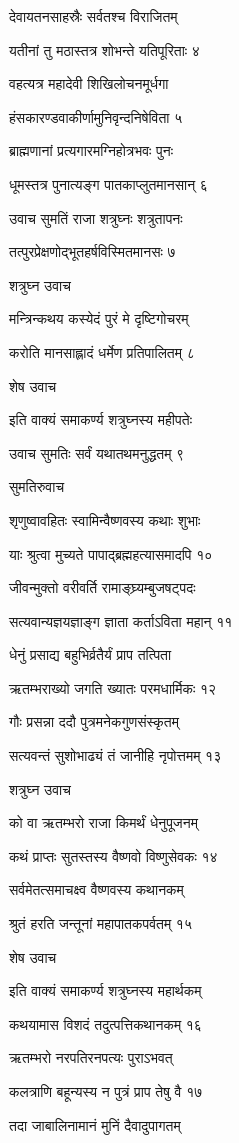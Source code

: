 देवायतनसाहस्रैः सर्वतश्च विराजितम्

यतीनां तु मठास्तत्र शोभन्ते यतिपूरिताः ४

वहत्यत्र महादेवी शिखिलोचनमूर्धगा

हंसकारण्डवाकीर्णामुनिवृन्दनिषेविता ५

ब्राह्मणानां प्रत्यगारमग्निहोत्रभवः पुनः

धूमस्तत्र पुनात्यङ्ग पातकाप्लुतमानसान् ६

उवाच सुमतिं राजा शत्रुघ्नः शत्रुतापनः

तत्पुरप्रेक्षणोद्भूतहर्षविस्मितमानसः ७

शत्रुघ्न उवाच

मन्त्रिन्कथय कस्येदं पुरं मे दृष्टिगोचरम्

करोति मानसाह्लादं धर्मेण प्रतिपालितम् ८

शेष उवाच

इति वाक्यं समाकर्ण्य शत्रुघ्नस्य महीपतेः

उवाच सुमतिः सर्वं यथातथमनुद्धतम् ९

सुमतिरुवाच

शृणुष्वावहितः स्वामिन्वैष्णवस्य कथाः शुभाः

याः श्रुत्वा मुच्यते पापाद्ब्रह्महत्यासमादपि १०

जीवन्मुक्तो वरीवर्ति रामाङ्घ्र्यम्बुजषट्पदः

सत्यवान्यज्ञयज्ञाङ्ग ज्ञाता कर्ताऽविता महान् ११

धेनुं प्रसाद्य बहुभिर्व्रतैर्यं प्राप तत्पिता

ऋतम्भराख्यो जगति ख्यातः परमधार्मिकः १२

गौः प्रसन्ना ददौ पुत्रमनेकगुणसंस्कृतम्

सत्यवन्तं सुशोभाढ्यं तं जानीहि नृपोत्तमम् १३

शत्रुघ्न उवाच

को वा ऋतम्भरो राजा किमर्थं धेनुपूजनम्

कथं प्राप्तः सुतस्तस्य वैष्णवो विष्णुसेवकः १४

सर्वमेतत्समाचक्ष्व वैष्णवस्य कथानकम्

श्रुतं हरति जन्तूनां महापातकपर्वतम् १५

शेष उवाच

इति वाक्यं समाकर्ण्य शत्रुघ्नस्य महार्थकम्

कथयामास विशदं तदुत्पत्तिकथानकम् १६

ऋतम्भरो नरपतिरनपत्यः पुराऽभवत्

कलत्राणि बहून्यस्य न पुत्रं प्राप तेषु वै १७

तदा जाबालिनामानं मुनिं दैवादुपागतम्

